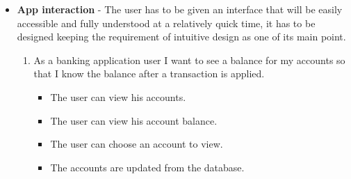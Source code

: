 \begin{itemize}
    \item  \textbf{App interaction} - The user has to be given an interface that will be easily accessible and fully understood at a relatively quick time, it has to be designed keeping the requirement of intuitive design as one of its main point.
        \begin{enumerate}
        \item As a banking application user I want to see a balance for my accounts so that I know the balance after a transaction is applied. \cite{userStories}
            \begin{itemize}
                \item The user can view his accounts.
                \item The user can view his account balance.
                \item The user can choose an account to view.
                \item The accounts are updated from the database.


\end{itemize}
\end{enumerate}
\end{itemize}

